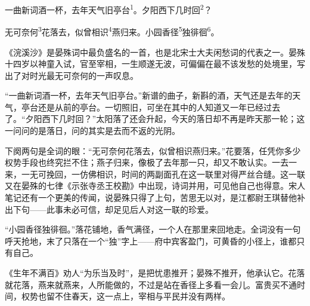 
\begin{poem}
一曲新词酒一杯，去年天气旧亭台\textsuperscript{1}。夕阳西下几时回\textsuperscript{2}？

无可奈何\textsuperscript{3}花落去，似曾相识\textsuperscript{4}燕归来。小园香径\textsuperscript{5}独徘徊\textsuperscript{6}。
\end{poem}

\begin{annotations}
\end{annotations}

\begin{appreciation}
《浣溪沙》是晏殊词中最负盛名的一首，也是北宋士大夫闲愁词的代表之一。晏殊十四岁以神童入试，官至宰相，一生顺遂无波，可偏偏在最不该发愁的处境里，写出了对时光最无可奈何的一声叹息。

“一曲新词酒一杯，去年天气旧亭台。”新谱的曲子，新斟的酒，天气还是去年的天气，亭台还是从前的亭台。一切照旧，可坐在其中的人知道又一年已经过去了。“夕阳西下几时回？”太阳落了还会升起，今天的落日却不再是昨天那一轮；这一问问的是落日，问的其实是去而不返的光阴。

下阕两句是全词的眼：“无可奈何花落去，似曾相识燕归来。”花要落，任凭你多少权势手段也终究拦不住；燕子归来，像极了去年那一只，却又不敢认实。一去一来，一无可挽回，一仿佛相识，时间的两副面孔在这一联里对得严丝合缝。这一联又在晏殊的七律《示张寺丞王校勘》中出现，诗词并用，可见他自己也得意。宋人笔记还有一个更美的传闻，说晏殊只得了上句，苦思无以对，是江都尉王琪替他补出下句——此事未必可信，却足见后人对这一联的珍爱。

“小园香径独徘徊。”落花铺地，香气满径，一个人在那里来回地走。全词没有一句呼天抢地，末了只落在一个“独”字上——府中宾客盈门，可黄昏的小径上，谁都只有自己。

《生年不满百》劝人“为乐当及时”，是把忧患推开；晏殊不推开，他承认它。花落就花落，燕来就燕来，人所能做的，不过是站在香径上多看一会儿。富贵买不通时间，权势也留不住春天，这一点上，宰相与平民并没有两样。
\end{appreciation}
